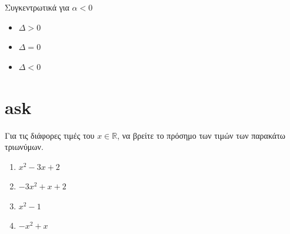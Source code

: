 \documentclass{presentation}
\begin{document}
\begin{frame}{Συγκεντρωτικά για $α<0$}
  \begin{center}
    \begin{itemize}
      \item $Δ > 0$
            \begin{center}
            \end{center}

      \item $Δ = 0$
            \begin{center}
            \end{center}

      \item $Δ < 0$
            \begin{center}
            \end{center}
    \end{itemize}

  \end{center}
\end{frame}

\section{ask}

\begin{askisi}
  Για τις διάφορες τιμές του $x\in\mathbb{R}$, να βρείτε το πρόσημο των τιμών των παρακάτω τριωνύμων.
  \begin{enumerate}[<+->]
    \item $x^2-3x+2$
    \item $-3x^2+x+2$
    \item $x^2-1$
    \item $-x^2+x$
  \end{enumerate}
\end{askisi}
\end{document}
